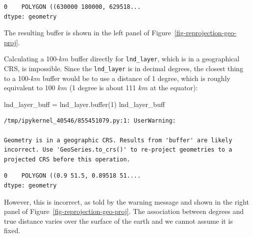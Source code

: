 \documentclass[
  letterpaper,
]{krantz}
\newenvironment{Shaded}{\begin{snugshade}}{\end{snugshade}}
\newcommand{\BuiltInTok}[1]{\textcolor[rgb]{0.00,0.23,0.31}{#1}}
\newcommand{\DecValTok}[1]{\textcolor[rgb]{0.68,0.00,0.00}{#1}}
\newcommand{\NormalTok}[1]{\textcolor[rgb]{0.00,0.23,0.31}{#1}}
\newcommand{\OperatorTok}[1]{\textcolor[rgb]{0.37,0.37,0.37}{#1}}
\begin{document}
\begin{verbatim}
0    POLYGON ((630000 180000, 629518...
dtype: geometry
\end{verbatim}

The resulting buffer is shown in the left panel of
Figure~\ref{fig-reprojection-geo-proj}.

Calculating a 100-\(km\) buffer directly for \texttt{lnd\_layer}, which
is in a geographical CRS, is impossible. Since the \texttt{lnd\_layer}
is in decimal degrees, the closest thing to a 100-\(km\) buffer would be
to use a distance of 1 degree, which is roughly equivalent to 100 \(km\)
(1 degree is about 111 \(km\) at the equator):

\begin{Shaded}
\begin{Highlighting}[]
\NormalTok{lnd\_layer\_buff }\OperatorTok{=}\NormalTok{ lnd\_layer.}\BuiltInTok{buffer}\NormalTok{(}\DecValTok{1}\NormalTok{)}
\NormalTok{lnd\_layer\_buff}
\end{Highlighting}
\end{Shaded}

\begin{verbatim}
/tmp/ipykernel_40546/855451079.py:1: UserWarning:

Geometry is in a geographic CRS. Results from 'buffer' are likely incorrect. Use 'GeoSeries.to_crs()' to re-project geometries to a projected CRS before this operation.

\end{verbatim}

\begin{verbatim}
0    POLYGON ((0.9 51.5, 0.89518 51....
dtype: geometry
\end{verbatim}

However, this is incorrect, as told by the warning message and shown in
the right panel of Figure~\ref{fig-reprojection-geo-proj}. The
association between degrees and true distance varies over the surface of
the earth and we cannot assume it is fixed.
\end{document}

